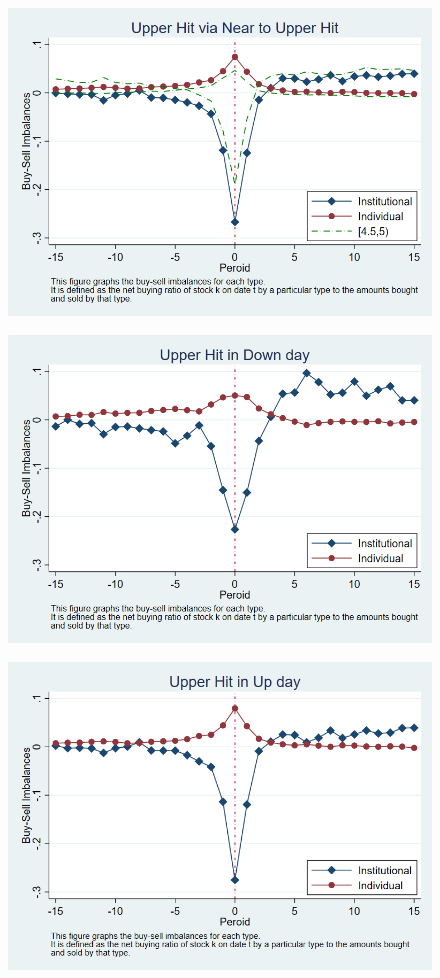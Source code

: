 \documentclass[12pt]{article}
\begin{document}
\begin{figure}[htbp]
\centering
\includegraphics[width=0.7\linewidth]{TUI}
\caption{}
\label{fig:tui}
\end{figure}

\begin{figure}[htbp]
\centering
\includegraphics[width=0.7\linewidth]{NUI}
\caption{}
\label{fig:NUI}
\end{figure}


\begin{figure}[htbp]
\centering
\includegraphics[width=0.7\linewidth]{PUI}
\caption{}
\label{fig:PUI}
\end{figure}
\end{document}
